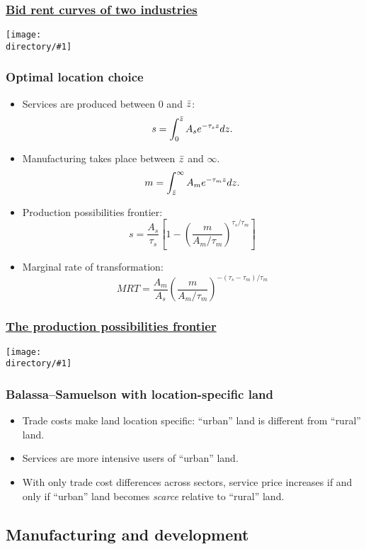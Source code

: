 \documentclass[compress,mathserif]{beamer}
\newcounter{perc}
\newcounter{percek}
\newcommand{\directory}{figures}
\newcommand{\widefigure}[2]{\begin{frame}\frametitle{\hyperlink{#1back}{#2}}\hypertarget{#1}{{\begin{center}\texttt{[image: \\directory/\#1]}\end{center}}}\end{frame}}
\renewcommand{\time}[1]{\addtocounter{percek}{#1}}
\begin{document}
\widefigure{bid-rent-2-exp}{Bid rent curves of two industries}
\time{3}

\begin{frame}\frametitle{Optimal location choice}
\begin{itemize}
\item Services are produced between $0$ and $\Bar z$:
\[
s = \int_0^{\Bar z}A_se^{-\tau_s z}dz.
\]
\item Manufacturing takes place between $\Bar z$ and $\infty$.
\[
m = \int_{\Bar z}^\infty A_me^{-\tau_m z}dz.
\]
\item Production possibilities frontier:
\[
s = \frac{A_s}{\tau_s}\left[1-\left(\frac{m}{A_m/\tau_m}\right)^{\tau_s/\tau_m}\right]
\]
\item Marginal rate of transformation:
\[
MRT = \frac{A_m}{A_s}\left(\frac{m}{A_m/\tau_m}\right)^{-(\tau_s-\tau_m)/\tau_m}
\]
\end{itemize}
\end{frame}

\widefigure{PPF-location}{The production possibilities frontier}



\begin{frame}\frametitle{Balassa--Samuelson with location-specific land}
\begin{itemize}
\item Trade costs make land location specific: ``urban'' land is different from ``rural'' land.
\item Services are more intensive users of ``urban'' land.
\item With only trade cost differences across sectors, service price increases if and only if ``urban'' land becomes \emph{scarce} relative to ``rural'' land.
\end{itemize}
\end{frame}

\subsection{Manufacturing and development}
\end{document}
